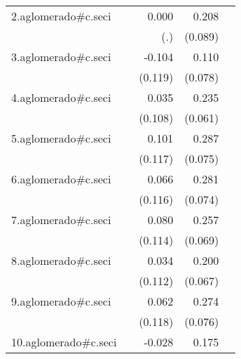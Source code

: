 {\begin{longtable}{l*{4}{D{.}{.}{-1}}}
\addlinespace
2.aglomerado#c.seci&                     &       0.000         &       0.208\sym{*}  &                     \\
            &                     &         (.)         &     (0.089)         &                     \\
\addlinespace
3.aglomerado#c.seci&                     &      -0.104         &       0.110         &                     \\
            &                     &     (0.119)         &     (0.078)         &                     \\
\addlinespace
4.aglomerado#c.seci&                     &       0.035         &       0.235\sym{***}&                     \\
            &                     &     (0.108)         &     (0.061)         &                     \\
\addlinespace
5.aglomerado#c.seci&                     &       0.101         &       0.287\sym{***}&                     \\
            &                     &     (0.117)         &     (0.075)         &                     \\
\addlinespace
6.aglomerado#c.seci&                     &       0.066         &       0.281\sym{***}&                     \\
            &                     &     (0.116)         &     (0.074)         &                     \\
\addlinespace
7.aglomerado#c.seci&                     &       0.080         &       0.257\sym{***}&                     \\
            &                     &     (0.114)         &     (0.069)         &                     \\
\addlinespace
8.aglomerado#c.seci&                     &       0.034         &       0.200\sym{**} &                     \\
            &                     &     (0.112)         &     (0.067)         &                     \\
\addlinespace
9.aglomerado#c.seci&                     &       0.062         &       0.274\sym{***}&                     \\
            &                     &     (0.118)         &     (0.076)         &                     \\
\addlinespace
10.aglomerado#c.seci&                     &      -0.028         &       0.175\sym{**} &                     \\

\end{longtable}}

